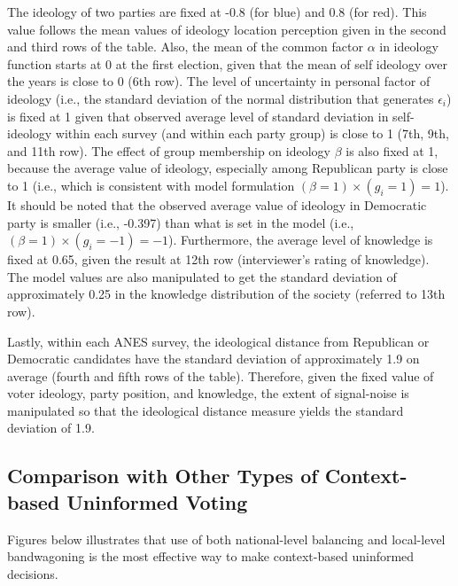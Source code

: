 \par The ideology of two parties are fixed at -0.8 (for blue) and 0.8 (for red). This value follows the mean values of ideology location perception given in the second and third rows of the table. Also, the mean of the common factor $\alpha$ in ideology function starts at 0 at the first election, given that the mean of self ideology over the years is close to 0 (6th row). The level of uncertainty in personal factor of ideology (i.e., the standard deviation of the normal distribution that generates $\epsilon_i$) is fixed at 1 given that observed average level of standard deviation in self-ideology within each survey (and within each party group) is close to 1 (7th, 9th, and 11th row). The effect of group membership on ideology $\beta$ is also fixed at 1, because the average value of ideology, especially among Republican party is close to 1 (i.e., which is consistent with model formulation $(\beta = 1) \times (g_i = 1) = 1$). It should be noted that the observed average value of ideology in Democratic party is smaller (i.e., -0.397) than what is set in the model (i.e., $(\beta = 1) \times (g_i = -1) = -1$). Furthermore, the average level of knowledge is fixed at 0.65, given the result at 12th row (interviewer's rating of knowledge). The model values are also manipulated to get the standard deviation of approximately 0.25 in the knowledge distribution of the society (referred to 13th row).   

\par Lastly, within each ANES survey, the ideological distance from Republican or Democratic candidates have the standard deviation of approximately 1.9 on average (fourth and fifth rows of the table). Therefore, given the fixed value of voter ideology, party position, and knowledge, the extent of signal-noise is manipulated so that the ideological distance measure yields the standard deviation of 1.9.     

\clearpage
\subsection{Comparison with Other Types of Context-based Uninformed Voting}

\par Figures below illustrates that use of both national-level balancing and local-level bandwagoning is the most effective way to make context-based uninformed decisions.

